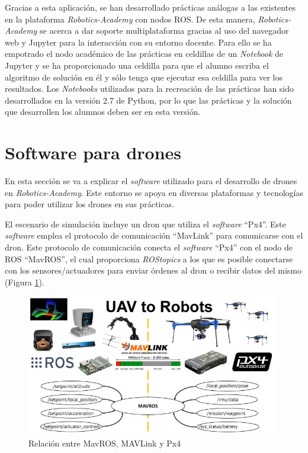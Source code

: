Gracias a esta aplicación, se han desarrollado prácticas análogas a las existentes en la plataforma \textit{Robotics-Academy} con nodos ROS. De esta manera, \textit{Robotics-Academy} se acerca a dar soporte multiplataforma gracias al uso del navegador web y Jupyter para la interacción con su entorno docente. Para ello se ha empotrado el nodo académico de las prácticas en celdillas de un \textit{Notebook} de Jupyter y se ha proporcionado una celdilla para que el alumno escriba el algoritmo de solución en él y sólo tenga que ejecutar esa celdilla para ver los resultados.
Los \textit{Notebooks} utilizados para la recreación de las prácticas han sido desarrollados en la versión 2.7 de Python, por lo que las prácticas y la solución que desarrollen los alumnos deben ser en esta versión.

\section{Software para drones}
En esta sección se va a explicar el \textit{software} utilizado para el desarrollo de drones en \textit{Robotics-Academy}. Este entorno se apoya en diversas plataformas y tecnologías para poder utilizar los drones en sus prácticas.

El escenario de simulación incluye un dron que utiliza el \textit{software} ``Px4''. Este \textit{software} emplea el protocolo de comunicación ``MavLink'' para comunicarse con el dron. Este protocolo de comunicación conecta el \textit{software} ``Px4'' con el nodo de ROS ``MavROS'', el cual proporciona \textit{ROStopics} a los que es posible conectarse con los sensores/actuadores para enviar órdenes al dron o recibir datos del mismo (Figura \ref{fig.rmmp}).

\begin{figure}[H]
	\begin{center}
	    \includegraphics[width=0.98\textwidth]{figures/MavROS_MAVLink_Px4.jpg}
		\caption{Relación entre MavROS, MAVLink y Px4}
		\label{fig.rmmp}
	\end{center}
\end{figure}

